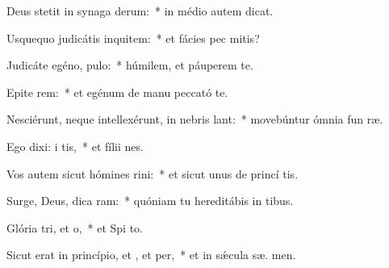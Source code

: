 \item Deus stetit in synaga derum:~* in médio autem  dicat.
\item Usquequo judicátis inquitem:~* et fácies pec mitis?
\item Judicáte egéno,  pulo:~* húmilem, et páuperem te.
\item Epite rem:~* et egénum de manu peccató te.
\item Nesciérunt, neque intellexérunt, in nebris lant:~* movebúntur ómnia fun ræ.
\item Ego dixi: i tis,~* et fílii  nes.
\item Vos autem sicut hómines rini:~* et sicut unus de princí tis.
\item Surge, Deus, dica ram:~* quóniam tu hereditábis in  tibus.
\item Glória tri, et o,~* et Spi to.
\item Sicut erat in princípio, et , et per,~* et in sǽcula sæ. men.
